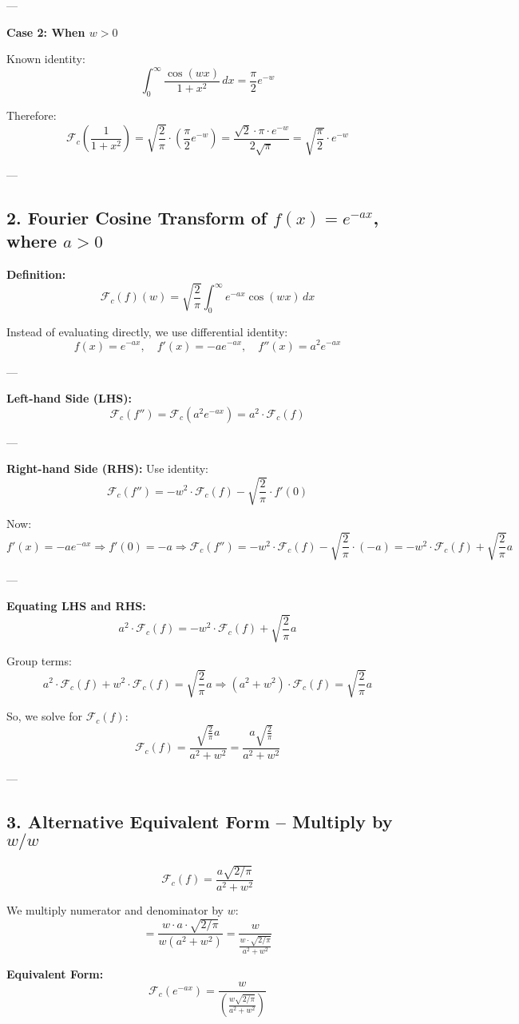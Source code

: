 \documentclass{article}
\begin{document}
---

\textbf{Case 2: When \( w > 0 \)}

Known identity:
\[
\int_0^\infty \frac{\cos(wx)}{1 + x^2} \, dx = \frac{\pi}{2} e^{-w}
\]

Therefore:
\[
\mathcal{F}_c\left( \frac{1}{1 + x^2} \right)
= \sqrt{\frac{2}{\pi}} \cdot \left( \frac{\pi}{2} e^{-w} \right)
= \frac{\sqrt{2} \cdot \pi \cdot e^{-w}}{2\sqrt{\pi}}
= \boxed{ \sqrt{ \frac{\pi}{2} } \cdot e^{-w} }
\]

---

\subsection*{2. Fourier Cosine Transform of \( f(x) = e^{-a x} \), where \( a > 0 \)}

\textbf{Definition:}
\[
\mathcal{F}_c(f)(w) = \sqrt{\frac{2}{\pi}} \int_0^\infty e^{-a x} \cos(wx) \, dx
\]

Instead of evaluating directly, we use differential identity:
\[
f(x) = e^{-a x}, \quad f'(x) = -a e^{-a x}, \quad f''(x) = a^2 e^{-a x}
\]

---

\textbf{Left-hand Side (LHS):}
\[
\mathcal{F}_c(f'') = \mathcal{F}_c(a^2 e^{-a x}) = a^2 \cdot \mathcal{F}_c(f)
\]

---

\textbf{Right-hand Side (RHS):}
Use identity:
\[
\mathcal{F}_c(f'') = -w^2 \cdot \mathcal{F}_c(f) - \sqrt{ \frac{2}{\pi} } \cdot f'(0)
\]

Now:
\[
f'(x) = -a e^{-a x} \Rightarrow f'(0) = -a
\Rightarrow \mathcal{F}_c(f'') = -w^2 \cdot \mathcal{F}_c(f) - \sqrt{ \frac{2}{\pi} } \cdot (-a)
= -w^2 \cdot \mathcal{F}_c(f) + \sqrt{ \frac{2}{\pi} } a
\]

---

\textbf{Equating LHS and RHS:}
\[
a^2 \cdot \mathcal{F}_c(f) = -w^2 \cdot \mathcal{F}_c(f) + \sqrt{ \frac{2}{\pi} } a
\]

Group terms:
\[
a^2 \cdot \mathcal{F}_c(f) + w^2 \cdot \mathcal{F}_c(f) = \sqrt{ \frac{2}{\pi} } a
\Rightarrow (a^2 + w^2) \cdot \mathcal{F}_c(f) = \sqrt{ \frac{2}{\pi} } a
\]

So, we solve for \( \mathcal{F}_c(f) \):
\[
\mathcal{F}_c(f) = \frac{ \sqrt{ \frac{2}{\pi} } a }{ a^2 + w^2 }
= \boxed{ \frac{ a \sqrt{ \frac{2}{\pi} } }{ a^2 + w^2 } }
\]

---

\subsection*{3. Alternative Equivalent Form – Multiply by \( w/w \)}

\[
\mathcal{F}_c(f) = \frac{ a \sqrt{2/\pi} }{ a^2 + w^2 }
\]

We multiply numerator and denominator by \( w \):
\[
= \frac{ w \cdot a \cdot \sqrt{2/\pi} }{ w(a^2 + w^2) }
= \frac{w}{ \frac{w \cdot \sqrt{2/\pi} }{ a^2 + w^2 } }
\]

\textbf{Equivalent Form:}
\[
\boxed{
\mathcal{F}_c(e^{-a x}) = \frac{w}{ \left( \frac{ w \sqrt{2/\pi} }{ a^2 + w^2 } \right) }
}
\]
\end{document}
